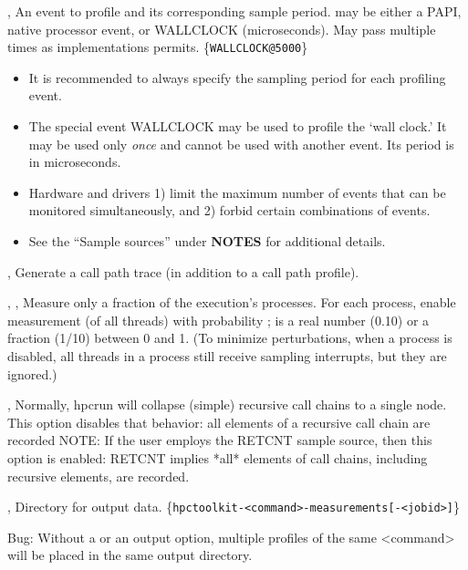 \documentclass[english]{article}
\begin{document}
\begin{Description}

\item[\OptArg{-e}{event\Lbr@period\Rbr}, \OptArg{--event}{event\Lbr@period\Rbr}]
An event to profile and its corresponding sample period.  may be either a PAPI, native processor event, or WALLCLOCK (microseconds).  May pass multiple times as implementations permits.  \{\verb+WALLCLOCK@5000+\}
\begin{itemize}
  \item It is recommended to always specify the sampling period for each profiling event.
  \item The special event WALLCLOCK may be used to profile the `wall clock.'  It may be used only \emph{once} and cannot be used with another event. Its period is in microseconds.
  \item Hardware and drivers 1) limit the maximum number of events that can be monitored simultaneously, and 2) forbid certain combinations of events. 
  \item See the ``Sample sources'' under \textbf{NOTES} for additional details.
\end{itemize}

\item[\Opt{-t}, \Opt{--trace}]
Generate a call path trace (in addition to a call path profile).

\item[\OptArg{-f}{frac}, \OptArg{-fp}{frac}, \OptArg{--process-fraction}{frac}]
Measure only a fraction  of the execution's processes.
For each process, enable measurement (of all threads) with probability ;  is a real number (0.10) or a fraction (1/10) between 0 and 1.
(To minimize perturbations, when a process is disabled, all threads in a process still receive sampling interrupts, but they are ignored.)

\item[\Opt{-r}, \Opt{--retain-recursion}]
Normally, hpcrun will collapse (simple) recursive call chains
to a single node. This option disables that behavior: all
elements of a recursive call chain are recorded
NOTE: If the user employs the RETCNT sample source, then this
      option is enabled: RETCNT implies *all* elements of
      call chains, including recursive elements, are recorded.



\item[\OptArg{-o}{outpath}, \OptArg{--output}{outpath}]
Directory for output data.
\{\verb+hpctoolkit-<command>-measurements[-<jobid>]+\}

\begin{itemize}
 Bug: Without a  or an output option, multiple profiles of the same <command> will be placed in the same output directory.
\end{itemize}

\end{Description}
\end{document}

